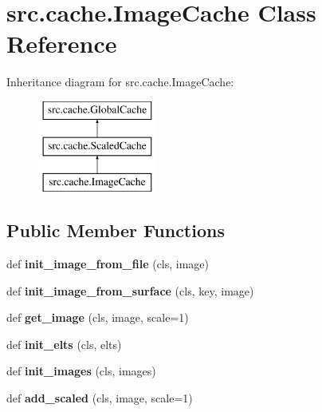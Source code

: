 \hypertarget{classsrc_1_1cache_1_1_image_cache}{}\section{src.\+cache.\+Image\+Cache Class Reference}
\label{classsrc_1_1cache_1_1_image_cache}
Inheritance diagram for src.\+cache.\+Image\+Cache\+:\begin{figure}[H]
\begin{center}
\leavevmode
\includegraphics[height=3.000000cm]{classsrc_1_1cache_1_1_image_cache}
\end{center}
\end{figure}
\subsection*{Public Member Functions}
\begin{DoxyCompactItemize}
\item 
\hypertarget{classsrc_1_1cache_1_1_image_cache_a9a3856223392b59367f2b5fb0edbd920}{}\label{classsrc_1_1cache_1_1_image_cache_a9a3856223392b59367f2b5fb0edbd920} 
def {\bfseries init\+\_\+image\+\_\+from\+\_\+file} (cls, image)
\item 
\hypertarget{classsrc_1_1cache_1_1_image_cache_a0052a41ea2b3fcd8cf0f2d372b144ba3}{}\label{classsrc_1_1cache_1_1_image_cache_a0052a41ea2b3fcd8cf0f2d372b144ba3} 
def {\bfseries init\+\_\+image\+\_\+from\+\_\+surface} (cls, key, image)
\item 
\hypertarget{classsrc_1_1cache_1_1_image_cache_a6c2deffa3e0e5a81022dd9a85403ea95}{}\label{classsrc_1_1cache_1_1_image_cache_a6c2deffa3e0e5a81022dd9a85403ea95} 
def {\bfseries get\+\_\+image} (cls, image, scale=1)
\item 
\hypertarget{classsrc_1_1cache_1_1_image_cache_a5178f0bcf5cad1360f0adbda18779715}{}\label{classsrc_1_1cache_1_1_image_cache_a5178f0bcf5cad1360f0adbda18779715} 
def {\bfseries init\+\_\+elts} (cls, elts)
\item 
\hypertarget{classsrc_1_1cache_1_1_image_cache_ae13ebe0cb7120244e3657ad2176ee26f}{}\label{classsrc_1_1cache_1_1_image_cache_ae13ebe0cb7120244e3657ad2176ee26f} 
def {\bfseries init\+\_\+images} (cls, images)
\item 
\hypertarget{classsrc_1_1cache_1_1_image_cache_af17d4f8f117dcf57aca5dc788444e85b}{}\label{classsrc_1_1cache_1_1_image_cache_af17d4f8f117dcf57aca5dc788444e85b} 
def {\bfseries add\+\_\+scaled} (cls, image, scale=1)
\end{DoxyCompactItemize}
